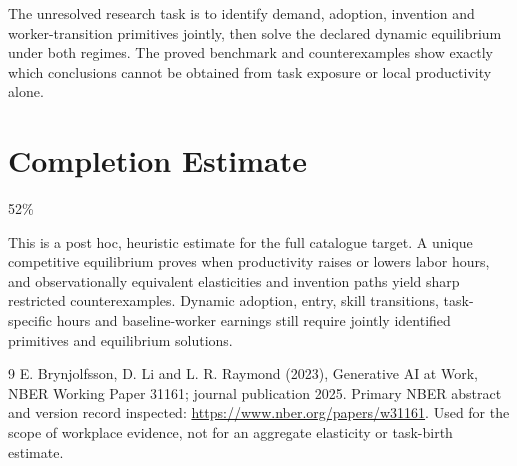 \documentclass[11pt]{article}
\begin{document}
The unresolved research task is to identify demand, adoption, invention and worker-transition primitives jointly, then solve the declared dynamic equilibrium under both regimes. The proved benchmark and counterexamples show exactly which conclusions cannot be obtained from task exposure or local productivity alone.

\section{Completion Estimate}
52\%

This is a post hoc, heuristic estimate for the full catalogue target.
A unique competitive equilibrium proves when productivity raises or lowers labor hours, and observationally equivalent elasticities and invention paths yield sharp restricted counterexamples. Dynamic adoption, entry, skill transitions, task-specific hours and baseline-worker earnings still require jointly identified primitives and equilibrium solutions.

\begin{thebibliography}{9}
 E. Brynjolfsson, D. Li and L. R. Raymond (2023), Generative AI at Work, NBER Working Paper 31161; journal publication 2025. Primary NBER abstract and version record inspected: \url{https://www.nber.org/papers/w31161}. Used for the scope of workplace evidence, not for an aggregate elasticity or task-birth estimate.
\end{thebibliography}
\end{document}
